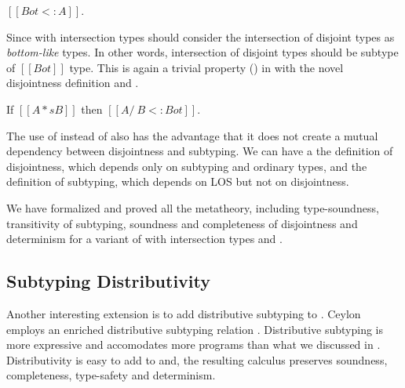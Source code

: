 \begin{lemma}
  $[[Bot <: A]]$.
\label{lemma:discussion:bls}
\end{lemma}

\noindent Since \cal with intersection types should consider the intersection of disjoint types 
as \emph{bottom-like} types. In other words, intersection of disjoint types
should be subtype of $[[Bot]]$ type.
This is again a trivial property () in \cal 
with the novel disjointness definition and .

\begin{lemma}
  If $[[A *s B]]$ then $[[A /\ B <: Bot]]$.
\label{lemma:discussion:disjoint-types}
\end{lemma}

\noindent The use of  instead of  also has the advantage that it does not
create a mutual dependency between disjointness and subtyping. We can have a the definition
of disjointness, which depends only on subtyping and ordinary types, and the definition
of subtyping, which depends on LOS but not on disjointness.

We have formalized and proved all the metatheory, including type-soundness, transitivity of subtyping,
soundness and completeness of disjointness and determinism for a variant of \name with intersection types
and .

\subsection{Subtyping Distributivity}
\label{sec:inter:dist}


Another interesting extension is to add distributive subtyping to \cal.
Ceylon~\cite{} employs an enriched distributive subtyping relation \cite{}.
Distributive subtyping is more expressive and accomodates more programs than what we discussed in
. Distributivity is easy to add to \cal and, the resulting 
calculus preserves soundness, completeness, type-safety and determinism. 

